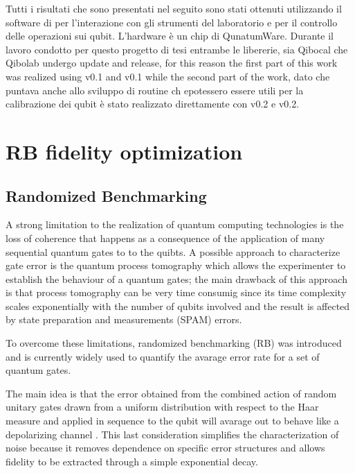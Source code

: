 Tutti i risultati che sono presentati nel seguito sono stati ottenuti utilizzando il software di \Qibolab per l'interazione con gli strumenti del laboratorio e \Qibocal per il controllo delle operazioni sui qubit.
L'hardware è un chip di QunatumWare. %
Durante il lavoro condotto per questo progetto di tesi entrambe le libererie, sia Qibocal che Qibolab undergo update and release, for this reason the first part of this work was realized using \Qibocal v0.1 and \Qibolab v0.1 while the second part of the work, 
dato che puntava anche allo sviluppo di routine ch epotessero essere utili per la calibrazione dei qubit è stato realizzato direttamente con \Qibocal v0.2 e \Qibolab v0.2. 

\section{RB fidelity optimization}

\subsection{Randomized Benchmarking}\label{RBsection}
A strong limitation to the realization of quantum computing technologies is the loss of coherence that happens as a consequence of the application of many sequential quantum gates to to the quibts.
A possible approach to characterize gate error is the quantum process tomography which allows the experimenter to establish the behaviour of a quantum gates; the main drawback of this approach is that process tomography can be very time consumig since its time complexity scales exponentially with the number of qubits involved \cite{QPTomography} and the result is affected by state preparation and measurements (SPAM) errors.

To overcome these limitations, randomized benchmarking (RB) was introduced and is currently widely used to quantify the avarage error rate for a set of quantum gates.

The main idea is that the error obtained from the combined action of random unitary gates drawn from a uniform distribution with respect to the Haar measure \cite{Mele_2024} and applied in sequence to the qubit will avarage out to behave like a depolarizing channel \cite{Emerson_2005_RB}.
This last consideration simplifies the characterization of noise because it removes dependence on specific error structures and allows fidelity to be extracted through a simple exponential decay.

